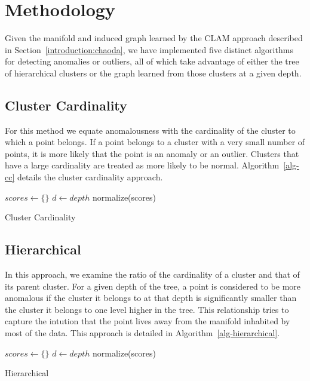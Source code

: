 \section{Methodology}
\label{sec:methodology}

Given the manifold and induced graph learned by the CLAM approach described in Section~\ref{introduction:chaoda}, we have implemented five distinct algorithms for detecting anomalies or outliers, all of which take advantage of either the tree of hierarchical clusters or the graph learned from those clusters at a given depth.


\subsection{Cluster Cardinality}

For this method we equate anomalousness with the cardinality of the cluster to which a point belongs.
If a point belongs to a cluster with a very small number of points, it is more likely that the point is an anomaly or an outlier.
Clusters that have a large cardinality are treated as more likely to be normal. Algorithm~\ref{alg-cc} details the cluster cardinality approach.

\begin{algorithm}
\DontPrintSemicolon
\SetAlgoLined
{}
 $scores \leftarrow \{\}$\;
 $d \leftarrow depth$\;
 normalize(scores)\;
 \caption{Cluster Cardinality}
 \label{alg-cc}
\end{algorithm}

\subsection{Hierarchical}

In this approach, we examine the ratio of the cardinality of a cluster and that of its parent cluster.
For a given depth of the tree, a point is considered to be more anomalous if the cluster it belongs to at that depth is significantly smaller than the cluster it belongs to one level higher in the tree.
This relationship tries to capture the intution that the point lives away from the manifold inhabited by most of the data. This approach is detailed in Algorithm~\ref{alg-hierarchical}.

\begin{algorithm}
\DontPrintSemicolon
\SetAlgoLined
{}
 $scores \leftarrow \{\}$\;
 $d \leftarrow depth$\;
 normalize(scores)\;
 \caption{Hierarchical}
 \label{alg-hierarchical}
\end{algorithm}

